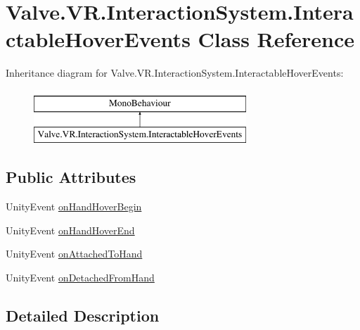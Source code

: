 \hypertarget{class_valve_1_1_v_r_1_1_interaction_system_1_1_interactable_hover_events}{}\section{Valve.\+V\+R.\+Interaction\+System.\+Interactable\+Hover\+Events Class Reference}
\label{class_valve_1_1_v_r_1_1_interaction_system_1_1_interactable_hover_events}
Inheritance diagram for Valve.\+V\+R.\+Interaction\+System.\+Interactable\+Hover\+Events\+:\begin{figure}[H]
\begin{center}
\leavevmode
\includegraphics[height=2.000000cm]{class_valve_1_1_v_r_1_1_interaction_system_1_1_interactable_hover_events}
\end{center}
\end{figure}
\subsection*{Public Attributes}
\begin{DoxyCompactItemize}
\item 
Unity\+Event \mbox{\hyperlink{class_valve_1_1_v_r_1_1_interaction_system_1_1_interactable_hover_events_a8cc8cef449b98238b7a37ad2247cd98d}{on\+Hand\+Hover\+Begin}}
\item 
Unity\+Event \mbox{\hyperlink{class_valve_1_1_v_r_1_1_interaction_system_1_1_interactable_hover_events_a1bc46e244cf67d56193720bcfd949553}{on\+Hand\+Hover\+End}}
\item 
Unity\+Event \mbox{\hyperlink{class_valve_1_1_v_r_1_1_interaction_system_1_1_interactable_hover_events_a1097e96806aeafb16ad517d494dd05b7}{on\+Attached\+To\+Hand}}
\item 
Unity\+Event \mbox{\hyperlink{class_valve_1_1_v_r_1_1_interaction_system_1_1_interactable_hover_events_a488b07b4b1b4433cc7aa987002b3c746}{on\+Detached\+From\+Hand}}
\end{DoxyCompactItemize}


\subsection{Detailed Description}


